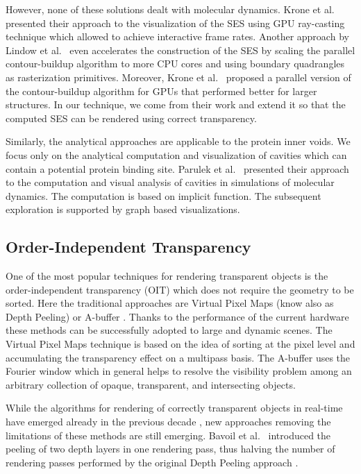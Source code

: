 However, none of these solutions dealt with molecular dynamics. 
Krone et al.~\cite{krone2009interactive} presented their approach to the visualization of the SES using GPU ray-casting technique which allowed to achieve interactive frame rates. 
Another approach by Lindow et al.~\cite{lindow2010accelerated} even accelerates the construction of the SES by scaling the parallel contour-buildup algorithm to more CPU cores and using boundary quadrangles as rasterization primitives.
Moreover, Krone et al.~\cite{krone2011parallel} proposed a parallel version of the contour-buildup algorithm for GPUs that performed better for larger structures.
In our technique, we come from their work and extend it so that the computed SES can be rendered using correct transparency.

Similarly, the analytical approaches are applicable to the protein inner voids. 
We focus only on the analytical computation and visualization of cavities which can contain a potential protein binding site.
Parulek et al.~\cite{parulek2013visual} presented their approach to the computation and visual analysis of cavities in simulations of molecular dynamics.
The computation is based on implicit function. 
The subsequent exploration is supported by graph based visualizations.

\subsection{Order-Independent Transparency}
One of the most popular techniques for rendering transparent objects is the order-independent transparency (OIT) which does not require the geometry to be sorted.
Here the traditional approaches are Virtual Pixel Maps (know also as Depth Peeling) \cite{mammen1989transparency} or A-buffer \cite{carpenter1984abuffer}.
Thanks to the performance of the current hardware these methods can be successfully adopted to large and dynamic scenes.
The Virtual Pixel Maps technique is based on the idea of sorting at the pixel level and accumulating the transparency effect on a multipass basis. 
The A-buffer uses the Fourier window which in general helps to resolve the visibility problem among an arbitrary collection of opaque, transparent, and intersecting objects.

While the algorithms for rendering of correctly transparent objects in real-time have emerged already in the previous decade \cite{everitt2001interactive}, new approaches removing the limitations of these methods are still emerging.
Bavoil et al.~\cite{bavoil2008order} introduced the peeling of two depth layers in one rendering pass, thus halving the number of rendering passes performed by the original Depth Peeling approach \cite{everitt2001interactive}.

